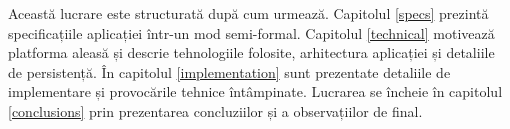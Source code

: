 
Această lucrare este structurată după cum urmează. Capitolul \ref{specs} prezintă specificațiile aplicației \AppName într-un mod semi-formal. Capitolul \ref{technical} motivează platforma aleasă și descrie tehnologiile folosite, arhitectura aplicației și detaliile de persistență. În capitolul \ref{implementation} sunt prezentate detaliile de implementare și provocările tehnice întâmpinate. Lucrarea se încheie în capitolul \ref{conclusions} prin prezentarea concluziilor și a observațiilor de final.
